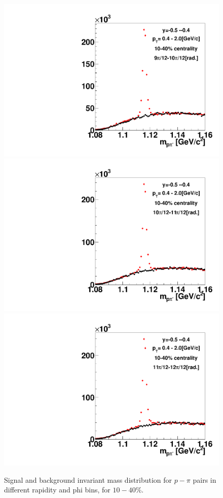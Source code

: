 \begin{figure}[h]
\includegraphics[width=0.14\linewidth]{chapterX/fig/ld_v1_sig/kf_ptslice0_cent1_ld_flow_phi10_rap9_check.pdf}
\includegraphics[width=0.14\linewidth]{chapterX/fig/ld_v1_sig/kf_ptslice0_cent1_ld_flow_phi11_rap9_check.pdf}
\includegraphics[width=0.14\linewidth]{chapterX/fig/ld_v1_sig/kf_ptslice0_cent1_ld_flow_phi12_rap9_check.pdf}

\caption{Signal and background invariant mass distribution for $p-\pi$ pairs in different rapidity and phi bins, for $10-40\%$.}
\label{ld_v1_sig_raw}
\end{figure}

